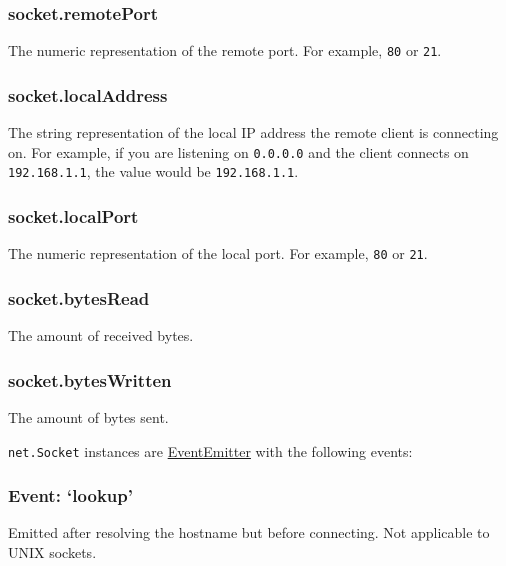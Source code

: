 \subsubsection{socket.remotePort}\label{socket.remoteport}

The numeric representation of the remote port. For example, \texttt{80}
or \texttt{21}.

\subsubsection{socket.localAddress}\label{socket.localaddress}

The string representation of the local IP address the remote client is
connecting on. For example, if you are listening on
\texttt{\textquotesingle{}0.0.0.0\textquotesingle{}} and the client
connects on \texttt{\textquotesingle{}192.168.1.1\textquotesingle{}},
the value would be
\texttt{\textquotesingle{}192.168.1.1\textquotesingle{}}.

\subsubsection{socket.localPort}\label{socket.localport}

The numeric representation of the local port. For example, \texttt{80}
or \texttt{21}.

\subsubsection{socket.bytesRead}\label{socket.bytesread}

The amount of received bytes.

\subsubsection{socket.bytesWritten}\label{socket.byteswritten}

The amount of bytes sent.

\texttt{net.Socket} instances are
\href{events.html\#events_class_events_eventemitter}{EventEmitter} with
the following events:

\subsubsection{\texorpdfstring{Event:
`lookup'}{Event: lookup}}\label{event-lookup}

Emitted after resolving the hostname but before connecting. Not
applicable to UNIX sockets.

